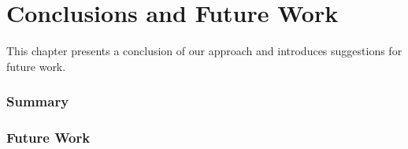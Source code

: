 
\chapter{Conclusions and Future Work}
\label{ch:Conclusions and Future Work}

This chapter presents a conclusion of our approach and introduces suggestions for future work. 

\subsection{Summary}
\label{sec:summary}


\subsection{Future Work}
\label{sec:future work}